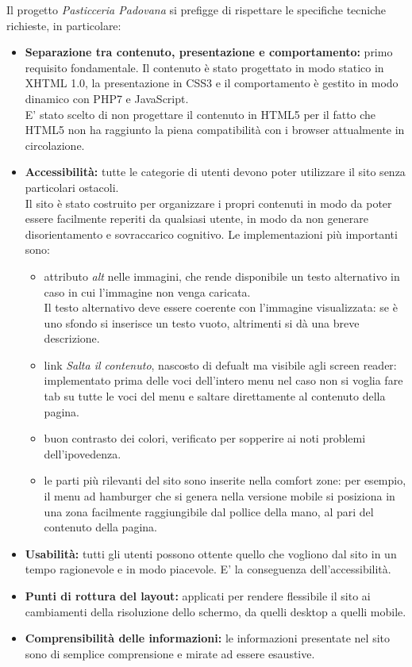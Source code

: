 Il progetto \emph{Pasticceria Padovana} si prefigge di rispettare le specifiche tecniche richieste, in particolare:
\begin{itemize}
	\item \textbf{Separazione tra contenuto, presentazione e comportamento:} primo requisito fondamentale. Il contenuto è stato progettato in modo statico in XHTML 1.0, la presentazione in CSS3 e il comportamento è gestito in modo dinamico con PHP7 e JavaScript.\\
	E' stato scelto di non progettare il contenuto in HTML5 per il fatto che HTML5 non ha raggiunto la piena compatibilità con i browser attualmente in circolazione.\\
	\item \textbf{Accessibilità:} tutte le categorie di utenti devono poter utilizzare il sito senza particolari ostacoli.\\ Il sito è stato costruito per organizzare i propri contenuti in modo da poter essere facilmente reperiti da qualsiasi utente, in modo da non generare disorientamento e sovraccarico cognitivo. Le implementazioni più importanti sono:
	\begin{itemize}
		\item attributo \emph{alt} nelle immagini, che rende disponibile un testo alternativo in caso in cui l'immagine non venga caricata.\\ Il testo alternativo deve essere coerente con l'immagine visualizzata: se è uno sfondo si inserisce un testo vuoto, altrimenti si dà una breve descrizione.
		\item link \emph{Salta il contenuto}, nascosto di defualt ma visibile agli screen reader: implementato prima delle voci dell'intero menu nel caso non si voglia fare tab su tutte le voci del menu e saltare direttamente al contenuto della pagina.\\
		\item buon contrasto dei colori, verificato per sopperire ai noti problemi dell'ipovedenza.\\
		\item le parti più rilevanti del sito sono inserite nella comfort zone: per esempio, il menu ad hamburger che si genera nella versione mobile si posiziona in una zona facilmente raggiungibile dal pollice della mano, al pari del contenuto della pagina.\\
	\end{itemize}
	\item \textbf{Usabilità:} tutti gli utenti possono ottente quello che vogliono dal sito in un tempo ragionevole e in modo piacevole. E' la conseguenza dell'accessibilità.\\ 
	\item \textbf{Punti di rottura del layout:} applicati per rendere flessibile il sito ai cambiamenti della risoluzione dello schermo, da quelli desktop a quelli mobile.\\
	\item \textbf{Comprensibilità delle informazioni:} le informazioni presentate nel sito sono di semplice comprensione e mirate ad essere esaustive.\\
\end{itemize}
